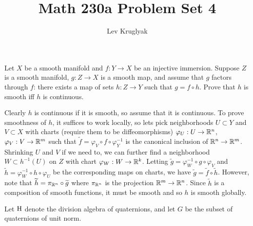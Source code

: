 \documentclass{../../templates/lkx_pset}
\title{Math 230a Problem Set 4}
\author{Lev Kruglyak}
\begin{document}
\maketitle

\begin{problem}{1}
Let $X$ be a smooth manifold and $f : Y \to X$ be an injective immersion. Suppose $Z$ is a smooth manifold, $g: Z \to X$ is a smooth map, and assume that $g$ factors through $f$: there exists a map of sets $h : Z \to Y$ such that $g = f\circ h$. Prove that $h$ is smooth iff $h$ is continuous.
\end{problem}

\begin{solution}
	Clearly $h$ is continuous if it is smooth, so assume that it is continuous. To prove smoothness of $h$, it suffices to work locally, so lets pick neighborhoods $U\subset Y$ and $V\subset X$ with charts (require them to be diffeomorphisms) $\varphi_U : U \to \mathbb{R}^n$, $\varphi_V : V \to \mathbb{R}^m$ such that $\widetilde{f} = \varphi_V\circ f\circ\varphi_Y^{-1}$ is the canonical inclusion of $\mathbb{R}^n \to \mathbb{R}^m$. Shrinking $U$ and $V$ if we need to, we can further find a neighborhood $W\subset h^{-1}(U)$ on $Z$ with chart $\varphi_W : W \to \mathbb{R}^k$. Letting $\widetilde{g} = \varphi_W^{-1}\circ g \circ \varphi_V$ and $\widetilde{h} = \varphi_W^{-1}\circ h\circ \varphi_U$ be the corresponding maps on charts, we have $\widetilde{g} = \widetilde{f}\circ \widetilde{h}$. However, note that $\widetilde{h} = \pi_{\mathbb{R}^n}\circ \widetilde{g}$ where $\pi_{\mathbb{R}^n}$ is the projection $\mathbb{R}^m\to \mathbb{R}^n$. Since $\widetilde{h}$ is a composition of smooth functions, it must be smooth and so $h$ is smooth globally.
\end{solution}

\begin{problem}{2}
Let $\operatorname{H}$ denote the division algebra of quaternions, and let $G$ be the subset of quaternions of unit norm.
\end{problem}
\end{document}

